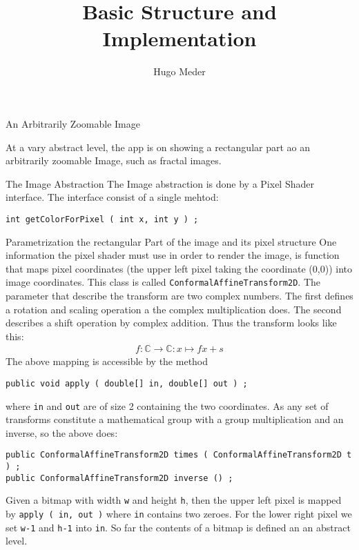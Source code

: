 \documentclass[a4paper,fleqn]{article}
\title{Basic Structure and Implementation}
\author{Hugo Meder}
\newcommand{\eeeccc}{\end{section}}
\numberwithin{equation}{section}
\newcommand{\beginchap}[1]{\begin{section}{#1}
}
\begin{document}
\begin{titlepage}
\maketitle
\end{titlepage}
\newpage

\beginchap{An Arbitrarily Zoomable Image}
At a vary abstract level, the app is on showing a rectangular part ao an arbitrarily zoomable Image, such as fractal images.
\begin{subsection}{The Image Abstraction}
The Image abstraction is done by a Pixel Shader interface. The interface consist of a single mehtod:
\begin{verbatim}
int getColorForPixel ( int x, int y ) ;
\end{verbatim}
\end{subsection}
\begin{subsection}{Parametrization the rectangular Part of the image and its pixel structure}
One information the pixel shader must use in order to render the image, is function that maps pixel coordinates (the upper left pixel taking the coordinate (0,0)) into image coordinates. This class is called
\verb{ConformalAffineTransform2D{. The parameter that describe the transform are two complex numbers. The first defines a rotation and scaling operation a the complex multiplication does. The second describes a shift operation by complex addition. Thus the transform looks like this:
\begin{eqnarray}
	f : \mathbb{C} \rightarrow \mathbb{C} : x \mapsto fx+s
\end{eqnarray}
The above mapping is accessible by the method
\begin{verbatim}
public void apply ( double[] in, double[] out ) ;
\end{verbatim}
where \verb{in{ and \verb{out{ are of size 2 containing the two coordinates.
As any set of transforms constitute a mathematical group with a group multiplication and an inverse, so the above does:
\begin{verbatim}
public ConformalAffineTransform2D times ( ConformalAffineTransform2D t ) ;
public ConformalAffineTransform2D inverse () ;
\end{verbatim}
Given a bitmap with width \verb{w{ and height \verb{h{, then the upper left pixel is mapped by \verb[apply ( in, out )[ where \verb[in[ contains two zeroes.
For the lower right pixel we set \verb{w-1{ and \verb{h-1{ into \verb{in{. So far the contents of a bitmap is defined an an abstract level.
\end{subsection}
\eeeccc
\end{document}
